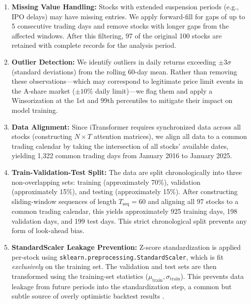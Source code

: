 \documentclass[12pt, a4paper]{article}
\begin{document}
\begin{enumerate}[leftmargin=2em]
    \item \textbf{Missing Value Handling:} Stocks with extended suspension periods (e.g., IPO delays) may have missing entries. We apply forward-fill for gaps of up to 5 consecutive trading days and remove stocks with longer gaps from the affected windows. After this filtering, 97 of the original 100 stocks are retained with complete records for the analysis period.

    \item \textbf{Outlier Detection:} We identify outliers in daily returns exceeding $\pm 3\sigma$ (standard deviations) from the rolling 60-day mean. Rather than removing these observations---which may correspond to legitimate price limit events in the A-share market ($\pm 10\%$ daily limit)---we flag them and apply a Winsorization at the 1st and 99th percentiles to mitigate their impact on model training.

    \item \textbf{Data Alignment:} Since iTransformer requires synchronized data across all stocks (constructing $N \times T$ attention matrices), we align all data to a common trading calendar by taking the intersection of all stocks' available dates, yielding 1,322 common trading days from January 2016 to January 2025.

    \item \textbf{Train-Validation-Test Split:} The data are split chronologically into three non-overlapping sets: training (approximately 70\%), validation (approximately 15\%), and testing (approximately 15\%). After constructing sliding-window sequences of length $T_{\text{seq}} = 60$ and aligning all 97 stocks to a common trading calendar, this yields approximately 925 training days, 198 validation days, and 199 test days. This strict chronological split prevents any form of look-ahead bias.

    \item \textbf{StandardScaler Leakage Prevention:} Z-score standardization is applied per-stock using \texttt{sklearn.preprocessing.StandardScaler}, which is fit \emph{exclusively} on the training set. The validation and test sets are then transformed using the training-set statistics ($\mu_{\text{train}}, \sigma_{\text{train}}$). This prevents data leakage from future periods into the standardization step, a common but subtle source of overly optimistic backtest results \citep{arlot2010survey}.
\end{enumerate}
\end{document}
